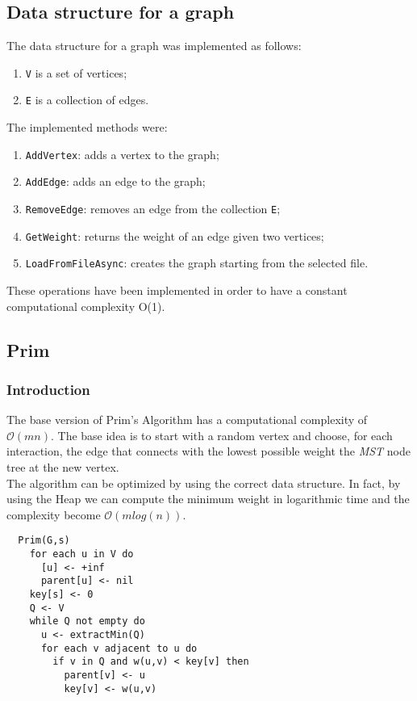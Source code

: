\subsection*{Data structure for a graph}
The data structure for a graph was implemented as follows:
\begin{enumerate}
    \item \verb|V| is a set of vertices;
    \item \verb|E| is a collection of edges.
    \end{enumerate}
\noindent
The implemented methods were:
\begin{enumerate}
    \item \verb|AddVertex|: adds a vertex to the graph;
    \item \verb|AddEdge|: adds an edge to the graph;
    \item \verb|RemoveEdge|: removes an edge from the collection \verb|E|;
    \item \verb|GetWeight|: returns the weight of an edge given two vertices;
    \item \verb|LoadFromFileAsync|: creates the graph starting from the selected file.
\end{enumerate}
These operations have been implemented in order to have a constant computational complexity O(1).

\subsection{Prim}
\subsubsection{Introduction}
The base version of Prim's Algorithm has a computational complexity of $\mathcal{O}(mn)$.
The base idea is to start with a random vertex and choose, for each interaction, the edge 
that connects with the lowest possible weight the \textit{MST} node tree at the new vertex.\\
The algorithm can be optimized by using the correct data structure.
In fact, by using the Heap we can compute the minimum weight in logarithmic time and the complexity become $\mathcal{O}(mlog(n))$.

\begin{verbatim}
  Prim(G,s)
    for each u in V do
      [u] <- +inf
      parent[u] <- nil
    key[s] <- 0
    Q <- V
    while Q not empty do
      u <- extractMin(Q)
      for each v adjacent to u do
        if v in Q and w(u,v) < key[v] then
          parent[v] <- u
          key[v] <- w(u,v)
\end{verbatim}

